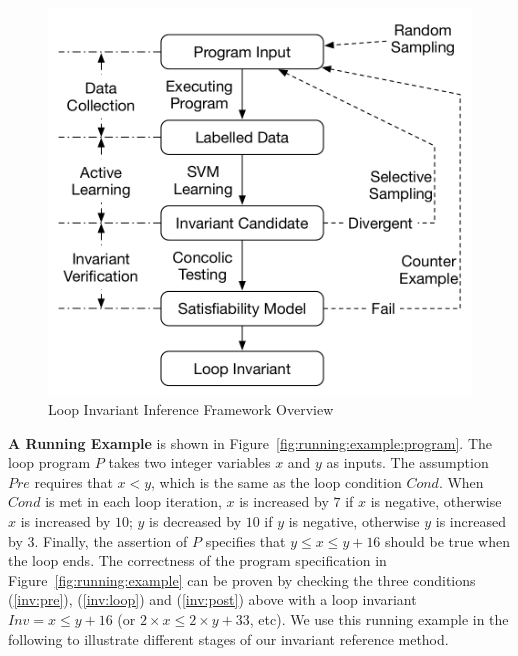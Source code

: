 \begin{figure}[t]
    \centering
    \includegraphics[scale=0.45]{figures/overview.pdf}
    \caption{Loop Invariant Inference Framework Overview}
    \label{fig:overview}
\end{figure}

\medskip\noindent
\textbf{A Running Example}
is shown in Figure~\ref{fig:running:example:program}.
The loop program $P$ takes two integer variables $x$ and $y$ as inputs.
The assumption $\mathit{Pre}$ requires that $x < y$,
which is the same as the loop condition $\mathit{Cond}$.
When $\mathit{Cond}$ is met in each loop iteration,
$x$ is increased by $7$ if $x$ is negative, otherwise $x$ is increased by $10$;
$y$ is decreased by $10$ if $y$ is negative, otherwise $y$ is increased by $3$.
Finally, the assertion of $P$ specifies that
$y \le x \le y + 16$ should be true when the loop ends.
The correctness of the program specification in Figure~\ref{fig:running:example}
can be proven by checking the three conditions
(\ref{inv:pre}), (\ref{inv:loop}) and (\ref{inv:post}) above
with a loop invariant $\mathit{Inv} = x \le y + 16$ (or $2 \times x \le 2 \times y + 33$, etc).
We use this running example in the following
to illustrate different stages of our invariant reference method.

